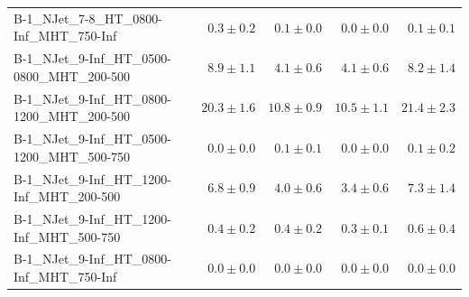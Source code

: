 \documentclass{beamer}
\begin{document}
\begin{frame}
\begin{tabular}{lrrrr}
       B-1\_NJet\_7-8\_HT\_0800-Inf\_MHT\_750-Inf &               $0.3\pm0.2$&               $0.1\pm0.0$&               $0.0\pm0.0$&                   $0.1\pm0.1$ \\
    B-1\_NJet\_9-Inf\_HT\_0500-0800\_MHT\_200-500 &               $8.9\pm1.1$&               $4.1\pm0.6$&               $4.1\pm0.6$&                   $8.2\pm1.4$ \\
    B-1\_NJet\_9-Inf\_HT\_0800-1200\_MHT\_200-500 &              $20.3\pm1.6$&              $10.8\pm0.9$&              $10.5\pm1.1$&                  $21.4\pm2.3$ \\
    B-1\_NJet\_9-Inf\_HT\_0500-1200\_MHT\_500-750 &               $0.0\pm0.0$&               $0.1\pm0.1$&               $0.0\pm0.0$&                   $0.1\pm0.2$ \\
     B-1\_NJet\_9-Inf\_HT\_1200-Inf\_MHT\_200-500 &               $6.8\pm0.9$&               $4.0\pm0.6$&               $3.4\pm0.6$&                   $7.3\pm1.4$ \\
     B-1\_NJet\_9-Inf\_HT\_1200-Inf\_MHT\_500-750 &               $0.4\pm0.2$&               $0.4\pm0.2$&               $0.3\pm0.1$&                   $0.6\pm0.4$ \\
     B-1\_NJet\_9-Inf\_HT\_0800-Inf\_MHT\_750-Inf &               $0.0\pm0.0$&               $0.0\pm0.0$&               $0.0\pm0.0$&                   $0.0\pm0.0$ \\

\bottomrule
\end{tabular}
\end{frame}
\end{document}
